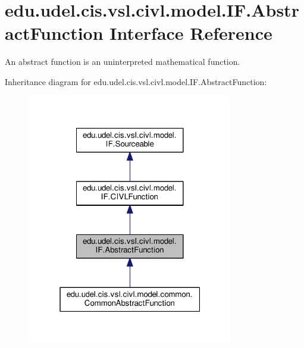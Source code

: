 \hypertarget{interfaceedu_1_1udel_1_1cis_1_1vsl_1_1civl_1_1model_1_1IF_1_1AbstractFunction}{}\section{edu.\+udel.\+cis.\+vsl.\+civl.\+model.\+I\+F.\+Abstract\+Function Interface Reference}
\label{interfaceedu_1_1udel_1_1cis_1_1vsl_1_1civl_1_1model_1_1IF_1_1AbstractFunction}


An abstract function is an uninterpreted mathematical function.  




Inheritance diagram for edu.\+udel.\+cis.\+vsl.\+civl.\+model.\+I\+F.\+Abstract\+Function\+:
\nopagebreak
\begin{figure}[H]
\begin{center}
\leavevmode
\includegraphics[width=256pt]{interfaceedu_1_1udel_1_1cis_1_1vsl_1_1civl_1_1model_1_1IF_1_1AbstractFunction__inherit__graph}
\end{center}
\end{figure}


